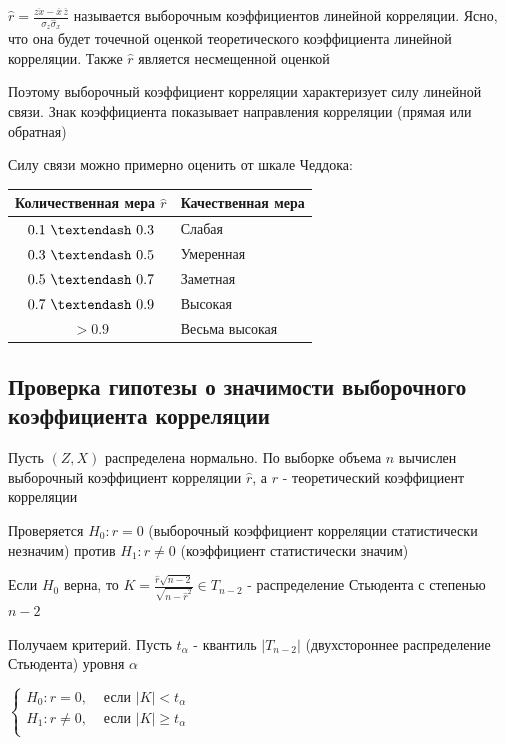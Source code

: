 \documentclass[12pt]{article}
\begin{document}
\Def $\hat r = \frac{\overline{z x} - \overline{x} \, \overline{z}}{\hat \sigma_z \hat \sigma_x}$ называется выборочным коэффициентов 
линейной корреляции. Ясно, что она будет точечной оценкой теоретического коэффициента линейной корреляции. 
Также $\hat r$ является несмещенной оценкой

Поэтому выборочный коэффициент корреляции характеризует силу линейной связи. Знак коэффициента показывает направления корреляции (прямая или обратная)

Силу связи можно примерно оценить от шкале Чеддока:

\smallvspace

\begin{tabular}{c|l}
    Количественная мера $\hat r$ & Качественная мера \\
    \hline
    $0.1 \ \textendash \ 0.3$ & Слабая \\
    $0.3 \ \textendash \ 0.5$ & Умеренная \\
    $0.5 \ \textendash \ 0.7$ & Заметная \\
    $0.7 \ \textendash \ 0.9$ & Высокая \\
    $> 0.9$ & Весьма высокая \\
\end{tabular}

\mediumvspace

\subsection{Проверка гипотезы о значимости выборочного коэффициента корреляции}

Пусть $(Z, X)$ распределена нормально. По выборке объема $n$ вычислен выборочный коэффициент корреляции $\hat r$, а $r$ - теоретический коэффициент корреляции

Проверяется $H_0 : r = 0$ (выборочный коэффициент корреляции статистически незначим) против $H_1 : r \neq 0$ (коэффициент статистически значим)

\begin{MyTheorem}
    Если $H_0$ верна, то $K = \frac{\hat r \sqrt{n - 2}}{\sqrt{n - \hat r^2}} \in T_{n - 2}$ - распределение Стьюдента с степенью $n - 2$ 
\end{MyTheorem}

Получаем критерий. Пусть $t_\alpha$ - квантиль $|T_{n - 2}|$ (двухстороннее распределение Стьюдента) уровня $\alpha$

$\begin{cases}
    H_0 : r = 0, & \text{ если } |K| < t_\alpha \\
    H_1 : r \neq 0, & \text{ если } |K| \geq t_\alpha \\
\end{cases}$
\end{document}
